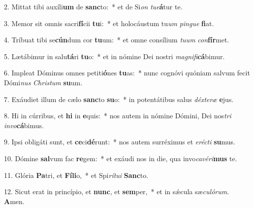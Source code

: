 2. Mittat tibi auxíli\textbf{um} de \textbf{sanc}to:~*  et de Si\textit{on} \textit{tu}\textit{e}\textbf{á}tur te.\

3. Memor sit omnis sacri\textbf{fí}cii \textbf{tu}i:~*  et holocáustum tu\textit{um} \textit{pin}\textit{gue} \textbf{fi}at.\

4. Tríbuat tibi se\textbf{cún}dum cor \textbf{tu}um:~*  et omne consílium \textit{tu}\textit{um} \textit{con}\textbf{fír}met.\

5. Lætábimur in salu\textbf{tá}ri \textbf{tu}o:~*  et in nómine Dei nostri \textit{ma}\textit{gni}\textit{fi}\textbf{cá}bimur.\

6. Impleat Dóminus omnes petiti\textbf{ó}nes \textbf{tu}as:~*  nunc cognóvi quóniam salvum fecit Dómi\textit{nus} \textit{Chris}\textit{tum} \textbf{su}um.\

7. Exáudiet illum de cælo \textbf{sanc}to \textbf{su}o:~*  in potentátibus salus \textit{déx}\textit{te}\textit{ræ} \textbf{e}jus.\

8. Hi in cúrribus, et \textbf{hi} in \textbf{e}quis:~*  nos autem in nómine Dómini, Dei nos\textit{tri} \textit{in}\textit{vo}\textbf{cá}bimus.\

9. Ipsi obligáti sunt, et \textbf{ce}ci\textbf{dé}runt:~*  nos autem surréximus et \textit{e}\textit{réc}\textit{ti} \textbf{su}mus.\

10. Dómine \textbf{sal}vum fac \textbf{re}gem:~*  et exáudi nos in die, qua invo\textit{ca}\textit{vé}\textit{ri}\textbf{mus} te.\

11. Glória \textbf{Pa}tri, et \textbf{Fí}\textbf{li}o,~*  et Spi\textit{rí}\textit{tu}\textit{i} \textbf{Sanc}to.\

12. Sicut erat in princípio, et \textbf{nunc}, et \textbf{sem}per,~*  et in sǽcula sæ\textit{cu}\textit{ló}\textit{rum}. \textbf{A}men.\

